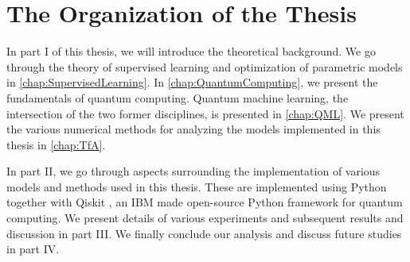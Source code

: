 \section{The Organization of the Thesis}
In part I of this thesis, we will introduce the theoretical background. We go through the theory of supervised learning and optimization of parametric models in \cref{chap:SupervisedLearning}. In \cref{chap:QuantumComputing}, we present the fundamentals of quantum computing. Quantum machine learning, the intersection of the two former disciplines, is presented in \cref{chap:QML}. We present the various numerical methods for analyzing the models implemented in this thesis in \cref{chap:TfA}. 

In part II, we go through aspects surrounding the implementation of various models and methods used in this thesis. These are implemented using Python together with Qiskit \cite{Qiskit}, an IBM made open-source Python framework for quantum computing. We present details of various experiments and subsequent results and discussion in part III. We finally conclude our analysis and discuss future studies in part IV.

